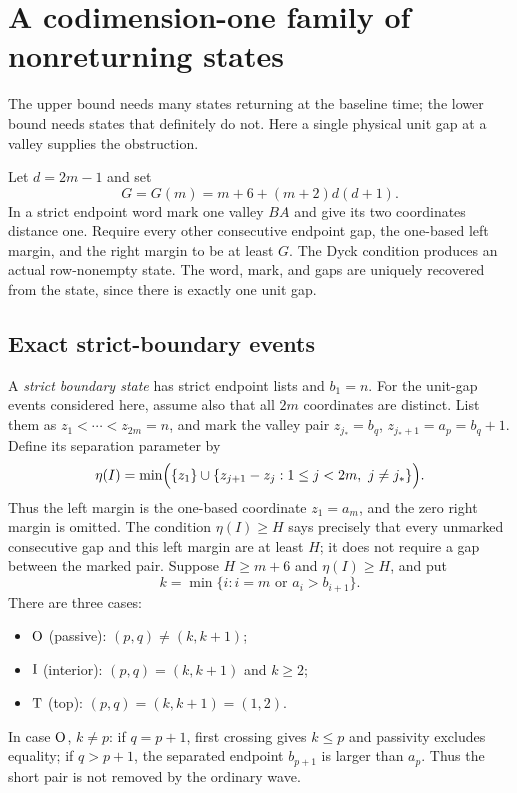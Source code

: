 \section{A codimension-one family of nonreturning states}\label{sec:nonreturn}
The upper bound needs many states returning at the baseline time; the lower bound needs states that definitely do not. Here a single physical unit gap at a valley supplies the obstruction.

Let $d=2m-1$ and set
\begin{equation}\label{eq:floor}
 G=G(m)=m+6+(m+2)d(d+1).
\end{equation}
In a strict endpoint word mark one valley $BA$ and give its two coordinates distance one. Require every other consecutive endpoint gap, the one-based left margin, and the right margin to be at least $G$. The Dyck condition produces an actual row-nonempty state. The word, mark, and gaps are uniquely recovered from the state, since there is exactly one unit gap.

\subsection{Exact strict-boundary events}
A \emph{strict boundary state} has strict endpoint lists and $b_1=n$. For the unit-gap events considered here, assume also that all $2m$ coordinates are distinct. List them as $z_1<\cdots<z_{2m}=n$, and mark the valley pair $z_{j_*}=b_q$, $z_{j_*+1}=a_p=b_q+1$. Define its separation parameter by
\[
 \eta(I)=\min\Bigl(\{z_1\}\cup
 \{z_{j+1}-z_j:1\le j<2m,\ j\ne j_*\}\Bigr).
\]
Thus the left margin is the one-based coordinate $z_1=a_m$, and the zero right margin is omitted. The condition $\eta(I)\ge H$ says precisely that every unmarked consecutive gap and this left margin are at least $H$; it does not require a gap between the marked pair. Suppose $H\ge m+6$ and $\eta(I)\ge H$, and put
\[
 k=\min\{i:i=m\text{ or }a_i>b_{i+1}\}.
\]
There are three cases:
\begin{itemize}
\item $\mathrm{O}$ (passive): $(p,q)\ne(k,k+1)$;
\item $\mathrm{I}$ (interior): $(p,q)=(k,k+1)$ and $k\ge2$;
\item $\mathrm{T}$ (top): $(p,q)=(k,k+1)=(1,2)$.
\end{itemize}
In case $\mathrm{O}$, $k\ne p$: if $q=p+1$, first crossing gives $k\le p$ and passivity excludes equality; if $q>p+1$, the separated endpoint $b_{p+1}$ is larger than $a_p$. Thus the short pair is not removed by the ordinary wave.

